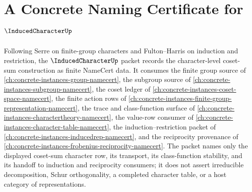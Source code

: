 \chapter{A Concrete Naming Certificate for $\InducedCharacterUp$}
\label{ch:concrete-instances-induced-character-namecert}

Following Serre on finite-group characters and Fulton--Harris on induction and restriction, the $\InducedCharacterUp$ packet records the character-level coset-sum construction as finite NameCert data. It consumes the finite group source of \autoref{ch:concrete-instances-group-namecert}, the subgroup source of \autoref{ch:concrete-instances-subgroup-namecert}, the coset ledger of \autoref{ch:concrete-instances-coset-space-namecert}, the finite action rows of \autoref{ch:concrete-instances-finite-group-representation-namecert}, the trace and class-function surface of \autoref{ch:concrete-instances-charactertheory-namecert}, the value-row consumer of \autoref{ch:concrete-instances-character-table-namecert}, the induction--restriction packet of \autoref{ch:concrete-instances-inducedrep-namecert}, and the reciprocity provenance of \autoref{ch:concrete-instances-frobenius-reciprocity-namecert}. The packet names only the displayed coset-sum character row, its transport, its class-function stability, and its handoff to induction and reciprocity consumers; it does not assert irreducible decomposition, Schur orthogonality, a completed character table, or a host category of representations.

